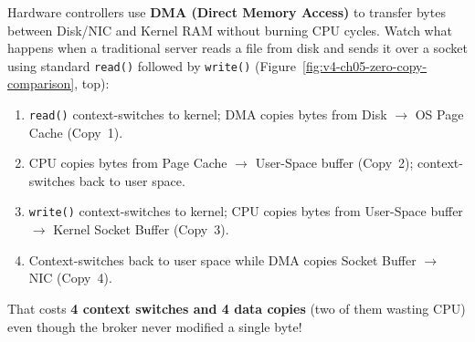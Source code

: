 Hardware controllers use \textbf{DMA (Direct Memory Access)} to transfer bytes between Disk/NIC and Kernel RAM without burning CPU cycles. Watch what happens when a traditional server reads a file from disk and sends it over a socket using standard \texttt{read()} followed by \texttt{write()} (Figure~\ref{fig:v4-ch05-zero-copy-comparison}, top):
\begin{enumerate}[leftmargin=18pt]
  \item \texttt{read()} context-switches to kernel; DMA copies bytes from Disk $\to$ OS Page Cache (Copy~1).
  \item CPU copies bytes from Page Cache $\to$ User-Space buffer (Copy~2); context-switches back to user space.
  \item \texttt{write()} context-switches to kernel; CPU copies bytes from User-Space buffer $\to$ Kernel Socket Buffer (Copy~3).
  \item Context-switches back to user space while DMA copies Socket Buffer $\to$ NIC (Copy~4).
\end{enumerate}
That costs \textbf{4 context switches and 4 data copies} (two of them wasting CPU) even though the broker never modified a single byte!

